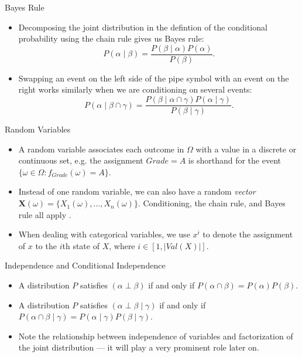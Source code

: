\documentclass[11pt]{beamer}
\begin{document}
\begin{frame}{Bayes Rule}
\begin{itemize}
	\item Decomposing the joint distribution in the defintion of the
	conditional probability using the chain rule gives us Bayes rule:
	\[
		P(\alpha \;|\; \beta) = \frac{P(\beta \;|\; \alpha)
		P(\alpha)}{P(\beta)}.
	\]
	\item Swapping an event on the left side of the pipe symbol with an
	event on the right works similarly when we are conditioning on several
	events:
	\[
		P(\alpha \;|\; \beta \cap \gamma) = \frac{P(\beta \;|\; \alpha
		\cap \gamma) P(\alpha \;|\; \gamma)}{P(\beta \;|\; \gamma)}.
	\]
\end{itemize}
\end{frame}

\begin{frame}{Random Variables}
\begin{itemize}
	\item A random variable associates each outcome in $\Omega$ with a value
	in a discrete or continuous set, e.g. the assignment $Grade = A$ is
	shorthand for the event $\{\omega \in \Omega: f_{Grade}(\omega) = A\}$.
	\item Instead of one random variable, we can also have a random
	\emph{vector} $\boldsymbol{X}(\omega) = \{X_{1}(\omega), \ldots,
	X_{n}(\omega)\}$. Conditioning, the chain rule, and Bayes rule all
	apply \cite{pgmslides}.
	\item When dealing with categorical variables, we use $x^{i}$ to
	denote the assignment of $x$ to the $i$th state of $X$, where $i
	\in [1, |Val(X)|]$.
\end{itemize}
\end{frame}

\begin{frame}{Independence and Conditional Independence}
\begin{itemize}
	\item A distribution $P$ satisfies $(\alpha \perp \beta)$ if and only if
	$P(\alpha \cap \beta) = P(\alpha)P(\beta)$.
	\item A distribution $P$ satisfies $(\alpha \perp \beta \;|\; \gamma)$
	if and only if $P(\alpha \cap \beta \;|\; \gamma) = P(\alpha \;|\;
	\gamma)P(\beta \;|\; \gamma)$.
	\item Note the relationship between independence of variables and
	factorization of the joint distribution --- it will play a very
	prominent role later on.
\end{itemize}
\end{frame}
\end{document}
